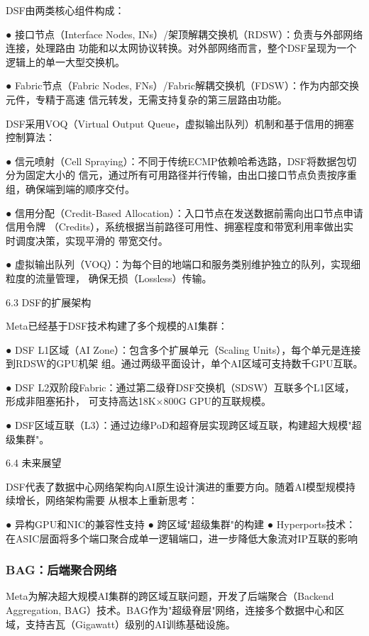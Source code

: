 DSF由两类核心组件构成：

● 接口节点（Interface Nodes, INs）/架顶解耦交换机（RDSW）：负责与外部网络连接，处理路由
  功能和以太网协议转换。对外部网络而言，整个DSF呈现为一个逻辑上的单一大型交换机。
  
● Fabric节点（Fabric Nodes, FNs）/Fabric解耦交换机（FDSW）：作为内部交换元件，专精于高速
  信元转发，无需支持复杂的第三层路由功能。

DSF采用VOQ（Virtual Output Queue，虚拟输出队列）机制和基于信用的拥塞控制算法：

● 信元喷射（Cell Spraying）：不同于传统ECMP依赖哈希选路，DSF将数据包切分为固定大小的
  信元，通过所有可用路径并行传输，由出口接口节点负责按序重组，确保端到端的顺序交付。
  
● 信用分配（Credit-Based Allocation）：入口节点在发送数据前需向出口节点申请信用令牌
  （Credits），系统根据当前路径可用性、拥塞程度和带宽利用率做出实时调度决策，实现平滑的
  带宽交付。
  
● 虚拟输出队列（VOQ）：为每个目的地端口和服务类别维护独立的队列，实现细粒度的流量管理，
  确保无损（Lossless）传输。

6.3  DSF的扩展架构

Meta已经基于DSF技术构建了多个规模的AI集群：

● DSF L1区域（AI Zone）：包含多个扩展单元（Scaling Units），每个单元是连接到RDSW的GPU机架
  组。通过两级平面设计，单个AI区域可支持数千GPU互联。
  
● DSF L2双阶段Fabric：通过第二级脊DSF交换机（SDSW）互联多个L1区域，形成非阻塞拓扑，
  可支持高达18K×800G GPU的互联规模。
  
● DSF区域互联（L3）：通过边缘PoD和超脊层实现跨区域互联，构建超大规模"超级集群"。

6.4  未来展望

DSF代表了数据中心网络架构向AI原生设计演进的重要方向。随着AI模型规模持续增长，网络架构需要
从根本上重新思考：

● 异构GPU和NIC的兼容性支持
● 跨区域"超级集群"的构建
● Hyperports技术：在ASIC层面将多个端口聚合成单一逻辑端口，进一步降低大象流对IP互联的影响

\subsubsection{BAG：后端聚合网络}

Meta为解决超大规模AI集群的跨区域互联问题，开发了后端聚合（Backend Aggregation, BAG）技术。BAG作为"超级脊层"网络，连接多个数据中心和区域，支持吉瓦（Gigawatt）级别的AI训练基础设施。


